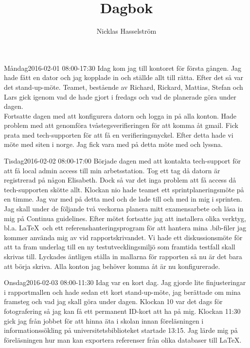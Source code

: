 \documentclass[a4paper,oneside]{book}
\title{\Huge Dagbok}
\author{Nicklas Hasselström}
\date{}
\begin{document}
\reversemarginpar
{}
\maketitle
\newpage

\begin{diary}{Måndag}{2016-02-01 08:00-17:30}
	Idag kom jag till kontoret för första gången. Jag hade fått en dator och jag kopplade in och ställde allt till rätta. Efter det så var det stand-up-möte. Teamet, bestående av Richard, Rickard, Mattias, Stefan och Lars gick igenom vad de hade gjort i fredags och vad de planerade göra under dagen.\\
	Fortsatte dagen med att konfigurera datorn och logga in på alla konton. Hade problem med att genomföra tvåstegsverifieringen för att komma åt gmail. Fick prata med tech-supporten för att få en verifieringsnyckel. Efter detta hade vi möte med siten i norge. Jag fick vara med på detta möte med och lyssna.
\end{diary}

\begin{diary}{Tisdag}{2016-02-02 08:00-17:00}
	Började dagen med att kontakta tech-support för att få local admin access till min arbetsstation. Tog ett tag då datorn är registrerad på någon Elisabeth. Dock så var det inga problem att få access då tech-supporten skötte  allt. Klockan nio hade teamet ett sprintplaneringsmöte på en timme. Jag var med på detta med och de lade till och med in mig i sprinten. Jag skall under de följande två veckorna planera mitt examensarbete och läsa in mig på Continua guidelines. Efter mötet fortsatte jag att installera olika verktyg, bl.a. \LaTeX\ och ett referenshanteringsprogram för att hantera mina .bib-filer jag kommer använda mig av vid rapportskrivandet. Vi hade ett diskussionsmöte för att ta fram underlag till en ny testutvecklingsmiljö som framtida testfall skall skrivas till. Lyckades äntligen ställa in mallarna för rapporten så nu är det bara att börja skriva. Alla konton jag behöver komma åt är nu konfigurerade.
\end{diary}

\begin{diary}{Onsdag}{2016-02-03 08:00-11:30}
	Idag var en kort dag. Jag gjorde lite finjusteringar i rapportmallen och hade sedan ett kort stand-up-möte, jag berättade om mina framsteg och vad jag skall göra under dagen. Klockan 10 var det dags för fotografering så jag kan få ett permanent ID-kort att ha på mig. Klockan 11:30 gick jag från jobbet för att hinna äta i skolan innan föreläsningen i informationssökling på universitetsbiblioteket startade 13:15. Jag lärde mig på föreläsningen hur man kan exportera referenser från olika databaser till \LaTeX .
\end{diary}
\end{document}
